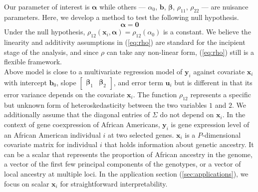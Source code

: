 \documentclass[aoas,preprint]{imsart}
\numberwithin{equation}{section}
\theoremstyle{plain}
\begin{document}
Our parameter of interest is $\bm{\alpha}$ while others --- $\alpha_0$, $\bm{b}$, $\bm{\beta}$, $\rho_{11}$, $\rho_{22}$ --- are nuisance parameters. Here, we develop a method to test the following null hypothesis.
\begin{equation}
    \bm{\alpha} = \bm{0}
    \label{eq:null}
\end{equation}
Under the null hypothesis, $\rho_{12}(\bm{x}_i, \bm{\alpha}) = \rho_{12}(\alpha_0)$ is a constant. We believe the linearity and additivity assumptions in (\ref{eq:rho}) are standard for the incipient stage of the analysis, and since $\rho$ can take any non-linear form, (\ref{eq:rho}) still is a flexible framework. \\

Above model is close to a multivariate regression model of $\bm{y}_i$ against covariate $\bm{x}_i$ with intercept $\bm{b}_0$, slope $\begin{bmatrix} \bm{\beta}_1 & \bm{\beta}_2 \end{bmatrix}$, and error term $\bm{u}_i$ but is different in that its error variance depends on the covariate $\bm{x}_i$. The function $\rho_{12}$ represents a specific but unknown form of heteroskedasticity between the two variables $1$ and $2$. We additionally assume that the diagonal entries of $\Sigma$ do not depend on $\bm{x}_i$. In the context of gene coexpression of African Americans, $\bm{y}_i$ is gene expression level of an African American individual $i$ at two selected genes. $\bm{x}_i$ is a $P$-dimensional covariate matrix for individual $i$ that holds information about genetic ancestry. It can be a scalar that represents the proportion of African ancestry in the genome, a vector of the first few principal components of the genotypes, or a vector of local ancestry at multiple loci. In the application section (\ref{sec:applications}), we focus on scalar $\bm{x}_i$ for straightforward interpretability. \\

\end{document}
